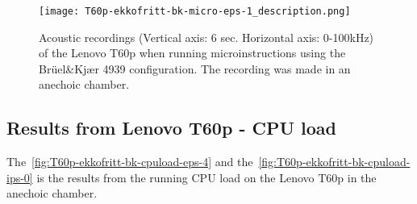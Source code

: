 \begin{figure}[ht]
    \centering
    \texttt{[image: T60p-ekkofritt-bk-micro-eps-1\_description.png]}
    \caption{Acoustic recordings (Vertical axis: 6 sec. Horizontal axis: 0-100kHz) of the Lenovo T60p when running microinstructions using the Brüel\&Kjær 4939 configuration. The recording was made in an anechoic chamber.}
    \label{fig:T60p-ekkofritt-bk-micro-eps-1}
\end{figure}


\subsection{Results from Lenovo T60p - CPU load}\label{chp5:subsec:t60p_bk_results_cpuload}
The~\autoref{fig:T60p-ekkofritt-bk-cpuload-eps-4} and the~\autoref{fig:T60p-ekkofritt-bk-cpuload-ips-0} is the results from the running CPU load on the Lenovo T60p in the anechoic chamber. 

